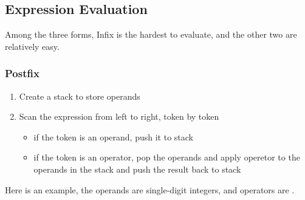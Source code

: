 \documentclass[letterpaper,10pt,english]{sphinxmanual}
\begin{document}
\subsection{Expression Evaluation}
\label{topics/evaluation:expression-evaluation}
Among the three forms, Infix is the hardest to evaluate, and the other two
are relatively easy.


\subsubsection{Postfix}
\label{topics/evaluation:id1}\begin{enumerate}
\item {} 
Create a stack to store operands

\item {} 
Scan the expression from left to right, token by token
\begin{itemize}
\item {} 
if the token is an operand, push it to stack

\item {} 
if the token is an operator, pop the operands and
apply operetor to the operands in the stack and
push the result back to stack

\end{itemize}

\end{enumerate}

Here is an example, the operands are single-digit integers, and operators are \code{+ - * /}.
\end{document}
